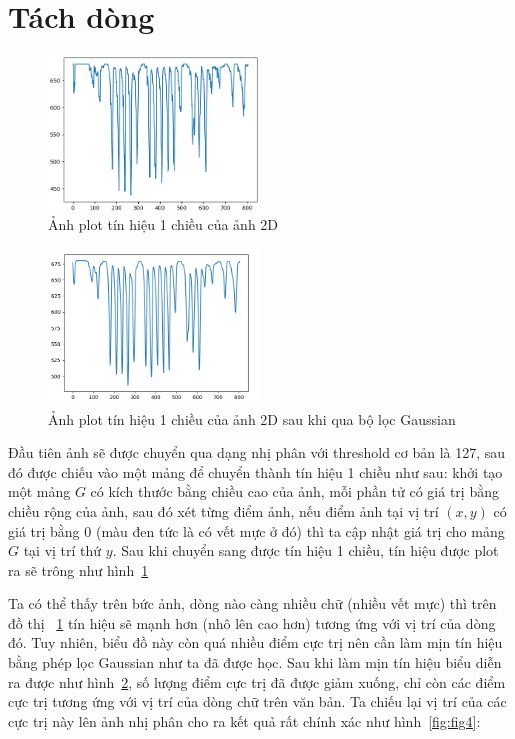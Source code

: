 \documentclass[a4paper]{article}
\begin{document}
\pagebreak

\section{Tách dòng}
\label{sec:2}

\begin{figure}
    \centering
    \includegraphics[width=0.5\textwidth]{projection1d.png}
    \caption{Ảnh plot tín hiệu 1 chiều của ảnh 2D}
    \label{fig:fig2}
\end{figure}

\begin{figure}
    \centering
    \includegraphics[width=0.5\textwidth]{gauss1d.png}
    \caption{Ảnh plot tín hiệu 1 chiều của ảnh 2D sau khi qua bộ lọc Gaussian}
    \label{fig:fig3}
\end{figure}

Đầu tiên ảnh sẽ được chuyển qua dạng nhị phân với threshold cơ bản là 127, sau đó được chiếu vào một mảng để chuyển thành tín hiệu 1 chiều như sau: khởi tạo một mảng $G$ có kích thước bằng chiều cao của ảnh, mỗi phần tử có giá trị bằng chiều rộng của ảnh, sau đó xét từng điểm ảnh, nếu điểm ảnh tại vị trí $(x, y)$ có giá trị bằng 0 (màu đen tức là có vết mực ở đó) thì ta cập nhật giá trị cho mảng $G$ tại vị trí thứ $y$. Sau khi chuyển sang được tín hiệu 1 chiều, tín hiệu được plot ra sẽ trông như hình~\ref{fig:fig2}\par

Ta có thể thấy trên bức ảnh, dòng nào càng nhiều chữ (nhiều vết mực) thì trên đồ thị ~\ref{fig:fig2} tín hiệu sẽ mạnh hơn (nhô lên cao hơn) tương ứng với vị trí của dòng đó. Tuy nhiên, biểu đồ này còn quá nhiều điểm cực trị nên cần làm mịn tín hiệu bằng phép lọc Gaussian như ta đã được học. Sau khi làm mịn tín hiệu biểu diễn ra được như hình~\ref{fig:fig3}, số lượng điểm cực trị đã được giảm xuống, chỉ còn các điểm cực trị tương ứng với vị trí của dòng chữ trên văn bản. Ta chiếu lại vị trí của các cực trị này lên ảnh nhị phân cho ra kết quả rất chính xác như hình~\ref{fig:fig4}:
\end{document}
